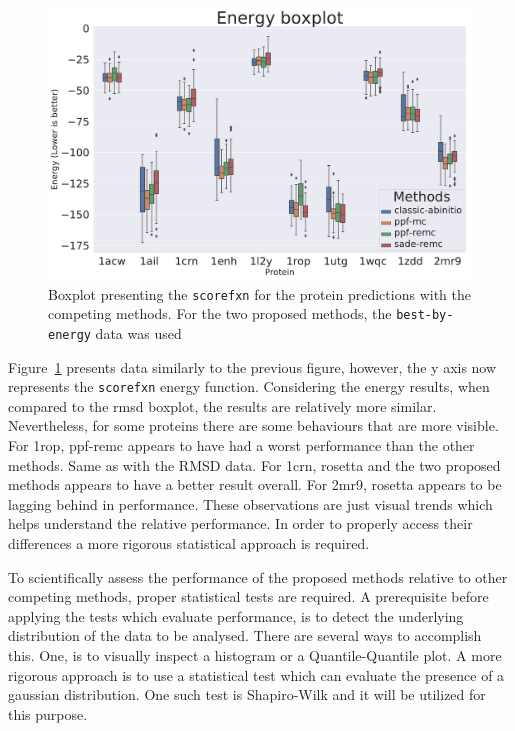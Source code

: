 \begin{figure}
  \includegraphics[width=\linewidth]{Figuras/boxplots/boxplot_best_by_energy_scorefxn.pdf}
  \caption{Boxplot presenting the \texttt{scorefxn} for the protein predictions with the
    competing methods. For the two proposed methods, the \texttt{best-by-energy}
    data was used}
  \label{fig:boxplot-energy}
\end{figure}

Figure~\ref{fig:boxplot-energy} presents data similarly to the previous figure,
however, the y axis now represents the \texttt{scorefxn} energy function. Considering
the energy results, when compared to the rmsd boxplot, the results are relatively
more similar. Nevertheless, for some proteins there are some behaviours that are
more visible. For 1rop, ppf-remc appears to have had a worst performance
than the other methods. Same as with the RMSD data. For 1crn, rosetta and the two
proposed methods appears to have a better result overall. For 2mr9, rosetta
appears to be lagging behind in performance. These observations are just visual
trends which helps understand the relative performance. In order to properly
access their differences a more rigorous statistical approach is required.

To scientifically assess the performance of the proposed methods relative to
other competing methods, proper statistical tests are required. A prerequisite
before applying the tests which evaluate performance, is to detect the
underlying distribution of the data to be analysed. There are several ways to
accomplish this. One, is to visually inspect a histogram or a Quantile-Quantile
plot. A more rigorous approach is to use a statistical test which can evaluate
the presence of a gaussian distribution. One such test is Shapiro-Wilk and it
will be utilized for this purpose.


